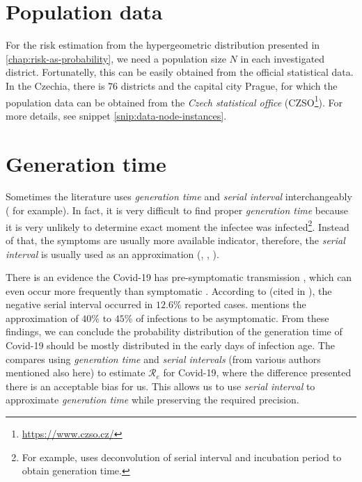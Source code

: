 \documentclass[
  digital, %
  oneside, %
  lof,     %
  lot,     %
]{fithesis4}
\begin{document}



\section{Population data}

For the risk estimation from the hypergeometric distribution
presented in \autoref{chap:risk-as-probability}, we need a population size 
$N$ in each investigated district.
Fortunatelly, this can be easily obtained from the official statistical data.
In the Czechia, there is 76 districts and the capital city Prague,
for which the population data can be obtained from the \textit{Czech
statistical office} (CZSO\footnote{\url{https://www.czso.cz/}}).
For more details, see snippet \ref{snip:data-node-instances}.


\section{Generation time}

Sometimes the literature uses \textit{generation time} and \textit{serial interval} interchangeably (\cite{wallinga2004} for example).
In fact, it is very difficult to find
proper \textit{generation time} because it is very unlikely to determine
exact moment the infectee was infected\footnote{For example, \cite{knight2020} 
uses deconvolution of serial interval and incubation period to obtain generation time.}.
Instead of that, the symptoms
are usually more available indicator, therefore, the
\textit{serial interval} is usually used as an approximation (\cite{griffin2010}, \cite{najafi2020}, \cite{cori2013}).

There is an evidence the Covid-19 has pre-symptomatic 
transmission \cite{ma2020}, which can even occur more frequently 
than symptomatic \cite{nishiura2020}.
According to \cite{du2020} (cited in \cite{knight2020}), the negative serial interval 
occurred in $12.6\%$ reported cases.
\cite{oran2020} mentions the approximation of $40\%$ to $45\%$ of 
infections to be asymptomatic.
From these findings, we can conclude the probability distribution of the
generation time of Covid-19 should be mostly distributed in the early
days of infection age.
The \cite{knight2020} compares using \textit{generation time} and 
\textit{serial intervals} (from various authors mentioned also here) 
to estimate $\mathcal{R}_e$ for Covid-19, where the difference
presented there is an acceptable bias for us.
This allows us to use \textit{serial interval} to approximate
\textit{generation time} while preserving the required precision.
\end{document}
